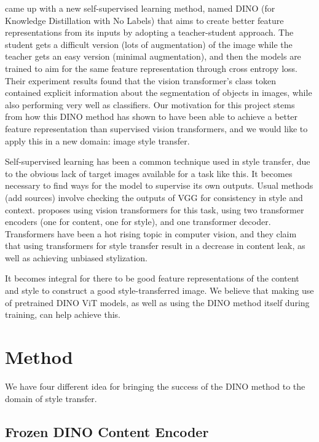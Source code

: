\documentclass{article}
\begin{document}
\cite{DINO} came up with a new self-supervised learning method, named DINO (for Knowledge Distillation with No Labels) that aims to create better feature representations from its inputs by adopting a teacher-student approach. The student gets a difficult version (lots of augmentation) of the image while the teacher gets an easy version (minimal augmentation), and then the models are trained to aim for the same feature representation through cross entropy loss. Their experiment results found that the vision transformer's class token contained explicit information about the segmentation of objects in images, while also performing very well as classifiers. Our motivation for this project stems from how this DINO method has shown to have been able to achieve a better feature representation than supervised vision transformers, and we would like to apply this in a new domain: image style transfer.

Self-supervised learning has been a common technique used in style transfer, due to the obvious lack of target images available for a task like this. It becomes necessary to find ways for the model to supervise its own outputs. Usual methods (add sources) involve checking the outputs of VGG for consistency in style and context. \cite{ImageStyleTransformer} proposes using vision transformers for this task, using two transformer encoders (one for content, one for style), and one transformer decoder. Transformers have been a hot rising topic in computer vision, and they claim that using transformers for style transfer result in a decrease in content leak, as well as achieving unbiased stylization.

It becomes integral for there to be good feature representations of the content and style to construct a good style-transferred image. We believe that making use of pretrained DINO ViT models, as well as using the DINO method itself during training, can help achieve this.


\section{Method}

We have four different idea for bringing the success of the DINO method to the domain of style transfer.

\subsection{Frozen DINO Content Encoder}
\end{document}
